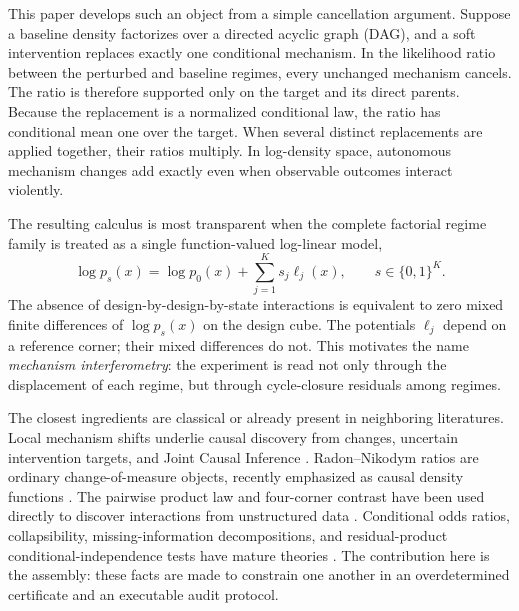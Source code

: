 \documentclass[11pt]{article}
\begin{document}
This paper develops such an object from a simple cancellation argument.  Suppose a baseline density factorizes over a directed acyclic graph (DAG), and a soft intervention replaces exactly one conditional mechanism.  In the likelihood ratio between the perturbed and baseline regimes, every unchanged mechanism cancels.  The ratio is therefore supported only on the target and its direct parents.  Because the replacement is a normalized conditional law, the ratio has conditional mean one over the target.  When several distinct replacements are applied together, their ratios multiply.  In log-density space, autonomous mechanism changes add exactly even when observable outcomes interact violently.

The resulting calculus is most transparent when the complete factorial regime family is treated as a single function-valued log-linear model,
\begin{equation}
\log p_s(x)=\log p_0(x)+\sum_{j=1}^K s_j\ell_j(x),
\qquad s\in\{0,1\}^K.
\label{eq:master-loglinear}
\end{equation}
The absence of design-by-design-by-state interactions is equivalent to zero mixed finite differences of \(\log p_s(x)\) on the design cube.  The potentials \(\ell_j\) depend on a reference corner; their mixed differences do not.  This motivates the name \emph{mechanism interferometry}: the experiment is read not only through the displacement of each regime, but through cycle-closure residuals among regimes.

The closest ingredients are classical or already present in neighboring literatures.  Local mechanism shifts underlie causal discovery from changes, uncertain intervention targets, and Joint Causal Inference \citep{tian2001changes,eaton2007interventions,mooij2020jci,squires2020utigsp,brouillard2020dcdi}.  Radon--Nikodym ratios are ordinary change-of-measure objects, recently emphasized as causal density functions \citep{mahadevan2026density}.  The pairwise product law and four-corner contrast have been used directly to discover interactions from unstructured data \citep{xu2024pairwise}.  Conditional odds ratios, collapsibility, missing-information decompositions, and residual-product conditional-independence tests have mature theories \citep{chen2007odds,tchetgen2010odds,greenland1999collapsibility,louis1982missing,shah2020gcm,scheidegger2022wgcm}.  The contribution here is the assembly: these facts are made to constrain one another in an overdetermined certificate and an executable audit protocol.
\end{document}
